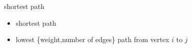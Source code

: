 \begin{frame}{shortest path}
\begin{itemize}
\item shortest path
\item lowest \{weight,number of edges\} path from vertex $i$ to $j$
\end{itemize}
\end{frame}
